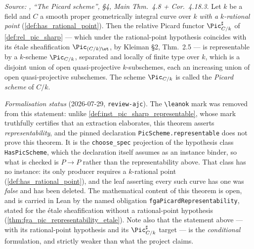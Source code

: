\begin{theorem}
  \label{thm:fga_pic_representability}
  \textit{Source: \cite{kleiman-picard}, ``The Picard scheme'', \S 4, Main Thm.~4.8
  + Cor.~4.18.3.}
  Let \(k\) be a field and \(C\) a smooth proper geometrically integral curve
  over \(k\) \emph{with a \(k\)-rational point}
  (\cref{def:has_rational_point}). Then the relative Picard functor
  \(\Pic^\sharp_{C/k}\) of \cref{def:rel_pic_sharp} --- which under the
  rational-point hypothesis coincides with its \'etale sheafification
  \(\Pic_{(C/k)\et}\), by Kleiman \S 2, Thm.~2.5 --- is representable by a
  \(k\)-scheme \(\Pic_{C/k}\), separated and locally of finite type over
  \(k\), which is a disjoint union of open quasi-projective
  \(k\)-subschemes, each an increasing union of open quasi-projective
  subschemes. The scheme \(\Pic_{C/k}\) is called the \emph{Picard scheme}
  of \(C/k\).

  \emph{Formalisation status} (2026-07-29, \texttt{review-ajc}). The
  \texttt{\textbackslash leanok} mark was removed from this statement: unlike
  \cref{def:inst_pic_sharp_representable}, whose mark truthfully certifies that
  an extraction elaborates, this theorem asserts \emph{representability}, and the
  pinned declaration
  \texttt{PicScheme.representable} does not prove this theorem. It is the
  \texttt{choose\_spec} projection of the hypothesis class
  \texttt{HasPicScheme}, which the declaration itself assumes as an instance
  binder, so what is checked is \(P \to P\) rather than the representability
  above. That class has no instance: its only producer requires a
  \(k\)-rational point (\cref{def:has_rational_point}), and the leaf asserting
  every such curve has one was \emph{false} and has been deleted. The
  mathematical content of this theorem is open, and is carried in Lean by the
  named obligation \texttt{fgaPicardRepresentability}, stated for the
  \'etale sheafification without a rational-point hypothesis
  (\cref{thm:fga_pic_representability_etale}). Note also that the statement
  above --- with its rational-point hypothesis and its
  \(\Pic^\sharp_{C/k}\) target --- is the \emph{conditional} formulation, and
  strictly weaker than what the project claims.
\end{theorem}

